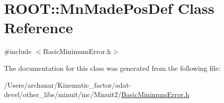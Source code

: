 \hypertarget{classROOT_1_1Minuit2_1_1BasicMinimumError_1_1MnMadePosDef}{}\section{R\+O\+OT\+:\+:Mn\+Made\+Pos\+Def Class Reference}
\label{classROOT_1_1Minuit2_1_1BasicMinimumError_1_1MnMadePosDef}


{\ttfamily \#include $<$Basic\+Minimum\+Error.\+h$>$}



The documentation for this class was generated from the following file\+:\begin{DoxyCompactItemize}
\item 
/\+Users/archanar/\+Kinematic\+\_\+factor/adat-\/devel/other\+\_\+libs/minuit/inc/\+Minuit2/\mbox{\hyperlink{adat-devel_2other__libs_2minuit_2inc_2Minuit2_2BasicMinimumError_8h}{Basic\+Minimum\+Error.\+h}}\end{DoxyCompactItemize}
